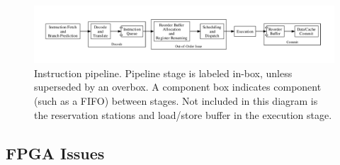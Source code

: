 \documentclass[12pt]{article}
\begin{document}
\begin{figure}[h]
    \centering
    \includegraphics[width=1.1\textwidth]{figures/pipeline.pdf}
    \caption{Instruction pipeline. Pipeline stage is labeled in-box, unless superseded by an overbox. A component box indicates component (such as a FIFO) between stages. Not included in this diagram is the reservation stations and load/store buffer in the execution stage.\label{fig:pipeline}}
\end{figure}



\subsection{FPGA Issues}


 
\end{document}
